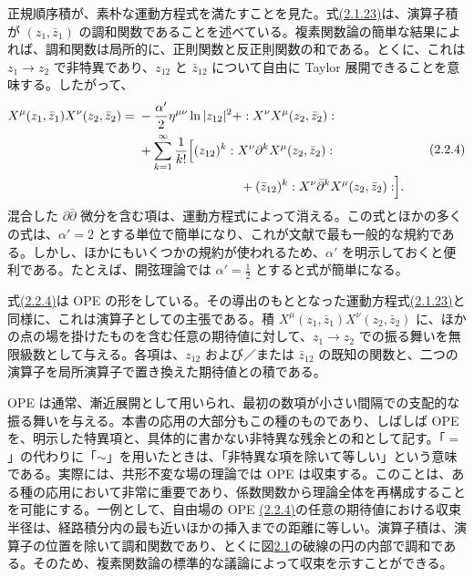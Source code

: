 正規順序積が、素朴な運動方程式を満たすことを見た。式\hyperref[eq:2.1.23]{(2.1.23)}は、演算子積が $(z_1,\bar z_1)$ の調和関数であることを述べている。複素関数論の簡単な結果によれば、調和関数は局所的に、正則関数と反正則関数の和である。とくに、これは $z_1\to z_2$ で非特異であり、$z_{12}$ と $\bar z_{12}$ について自由に Taylor 展開できることを意味する。したがって、
\begin{equation}
\begin{aligned}
X^\mu(z_1,\bar z_1)X^\nu(z_2,\bar z_2)
={}&-\frac{\alpha'}2\eta^{\mu\nu}\ln|z_{12}|^2
+:X^\nu X^\mu(z_2,\bar z_2):\\
&+\sum_{k=1}^\infty\frac1{k!}\Bigl[
(z_{12})^k:X^\nu\partial^kX^\mu(z_2,\bar z_2):\\
&\hspace{8em}
+(\bar z_{12})^k:X^\nu\bar\partial^kX^\mu(z_2,\bar z_2):\Bigr].
\end{aligned}
\tag{2.2.4}\label{eq:2.2.4}
\end{equation}
混合した $\partial\bar\partial$ 微分を含む項は、運動方程式によって消える。この式とほかの多くの式は、$\alpha'=2$ とする単位で簡単になり、これが文献で最も一般的な規約である。しかし、ほかにもいくつかの規約が使われるため、$\alpha'$ を明示しておくと便利である。たとえば、開弦理論では $\alpha'=\tfrac12$ とすると式が簡単になる。

式\hyperref[eq:2.2.4]{(2.2.4)}は OPE の形をしている。その導出のもととなった運動方程式\hyperref[eq:2.1.23]{(2.1.23)}と同様に、これは演算子としての主張である。積 $X^\mu(z_1,\bar z_1)X^\nu(z_2,\bar z_2)$ に、ほかの点の場を掛けたものを含む任意の期待値に対して、$z_1\to z_2$ での振る舞いを無限級数として与える。各項は、$z_{12}$ および／または $\bar z_{12}$ の既知の関数と、二つの演算子を局所演算子で置き換えた期待値との積である。

OPE は通常、漸近展開として用いられ、最初の数項が小さい間隔での支配的な振る舞いを与える。本書の応用の大部分もこの種のものであり、しばしば OPE を、明示した特異項と、具体的に書かない非特異な残余との和として記す。「$=$」の代わりに「$\sim$」を用いたときは、「非特異な項を除いて等しい」という意味である。実際には、共形不変な場の理論では OPE は収束する。このことは、ある種の応用において非常に重要であり、係数関数から理論全体を再構成することを可能にする。一例として、自由場の OPE \hyperref[eq:2.2.4]{(2.2.4)}の任意の期待値における収束半径は、経路積分内の最も近いほかの挿入までの距離に等しい。演算子積は、演算子の位置を除いて調和関数であり、とくに図\hyperref[fig:2.1]{2.1}の破線の円の内部で調和である。そのため、複素関数論の標準的な議論によって収束を示すことができる。

